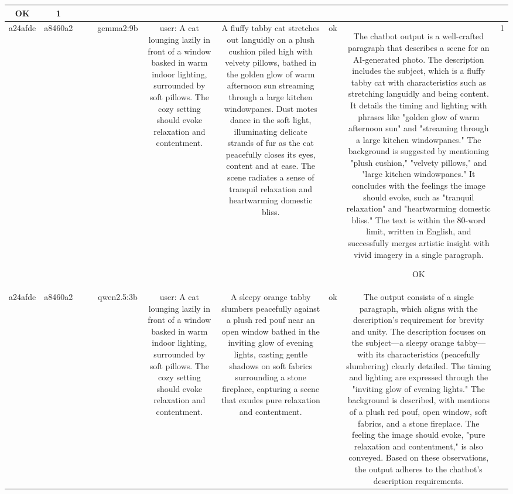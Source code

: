 \begin{table}[h!]
\begin{tabular}{|c|c|c|c|c|c|c|c|c|c|}
OK & 1\\
\hline
a24afde & a8460a2 &  &  & gemma2:9b & user: A cat lounging lazily in front of a window basked in warm indoor lighting, surrounded by soft pillows. The cozy setting should evoke relaxation and contentment. & A fluffy tabby cat stretches out languidly on a plush cushion piled high with velvety pillows, bathed in the golden glow of warm afternoon sun streaming through a large kitchen windowpanes. Dust motes dance in the soft light, illuminating delicate strands of fur as the cat peacefully closes its eyes, content and at ease. The scene radiates a sense of tranquil relaxation and heartwarming domestic bliss. 


 & ok & The chatbot output is a well-crafted paragraph that describes a scene for an AI-generated photo. The description includes the subject, which is a fluffy tabby cat with characteristics such as stretching languidly and being content. It details the timing and lighting with phrases like "golden glow of warm afternoon sun" and "streaming through a large kitchen windowpanes." The background is suggested by mentioning "plush cushion," "velvety pillows," and "large kitchen windowpanes." It concludes with the feelings the image should evoke, such as "tranquil relaxation" and "heartwarming domestic bliss." The text is within the 80-word limit, written in English, and successfully merges artistic insight with vivid imagery in a single paragraph.

OK & 1\\
\hline
a24afde & a8460a2 &  &  & qwen2.5:3b & user: A cat lounging lazily in front of a window basked in warm indoor lighting, surrounded by soft pillows. The cozy setting should evoke relaxation and contentment. & A sleepy orange tabby slumbers peacefully against a plush red pouf near an open window bathed in the inviting glow of evening lights, casting gentle shadows on soft fabrics surrounding a stone fireplace, capturing a scene that exudes pure relaxation and contentment. & ok & The output consists of a single paragraph, which aligns with the description's requirement for brevity and unity. The description focuses on the subject—a sleepy orange tabby—with its characteristics (peacefully slumbering) clearly detailed. The timing and lighting are expressed through the "inviting glow of evening lights." The background is described, with mentions of a plush red pouf, open window, soft fabrics, and a stone fireplace. The feeling the image should evoke, "pure relaxation and contentment," is also conveyed. Based on these observations, the output adheres to the chatbot's description requirements.


\end{tabular}
\end{table}
